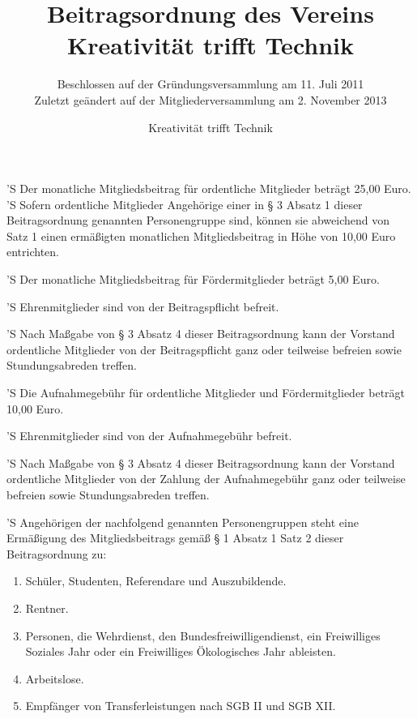 \documentclass[a4paper,10pt]{scrreprt}
\begin{document}
\title{Beitragsordnung des Vereins\\Kreativität trifft Technik}
\subtitle{Beschlossen auf der Gründungsversammlung am 11. Juli 2011\\
	Zuletzt geändert auf der Mitgliederversammlung am 2. November 2013}
\author{Kreativität trifft Technik}



\begin{contract}


'S Der monatliche Mitgliedsbeitrag für ordentliche Mitglieder beträgt 25,00
Euro.
'S Sofern ordentliche Mitglieder Angehörige einer in § 3 Absatz 1 dieser
Beitragsordnung genannten Personengruppe sind, können sie abweichend von
Satz 1 einen ermäßigten monatlichen Mitgliedsbeitrag in Höhe von 10,00
Euro entrichten.

'S Der monatliche Mitgliedsbeitrag für Fördermitglieder beträgt 5,00 Euro.

'S Ehrenmitglieder sind von der Beitragspflicht befreit.

'S Nach Maßgabe von § 3 Absatz 4 dieser Beitragsordnung kann der Vorstand
ordentliche Mitglieder von der Beitragspflicht ganz oder teilweise befreien
sowie Stundungsabreden treffen.


'S Die Aufnahmegebühr für ordentliche Mitglieder und Fördermitglieder beträgt
10,00 Euro.

'S Ehrenmitglieder sind von der Aufnahmegebühr befreit.

'S Nach Maßgabe von § 3 Absatz 4 dieser Beitragsordnung kann der Vorstand
ordentliche Mitglieder von der Zahlung der Aufnahmegebühr ganz oder teilweise
befreien sowie Stundungsabreden treffen.


'S Angehörigen der nachfolgend genannten Personengruppen steht eine Ermäßigung
des Mitgliedsbeitrags gemäß § 1 Absatz 1 Satz 2 dieser Beitragsordnung zu:
\begin{enumerate}
	\item Schüler, Studenten, Referendare und Auszubildende.
	\item Rentner.
	\item Personen, die Wehrdienst, den Bundesfreiwilligendienst, ein
          Freiwilliges Soziales Jahr oder ein Freiwilliges Ökologisches
          Jahr ableisten.
	\item Arbeitslose.
	\item Empfänger von Transferleistungen nach SGB II und SGB XII.
\end{enumerate}


\end{contract}
\end{document}
